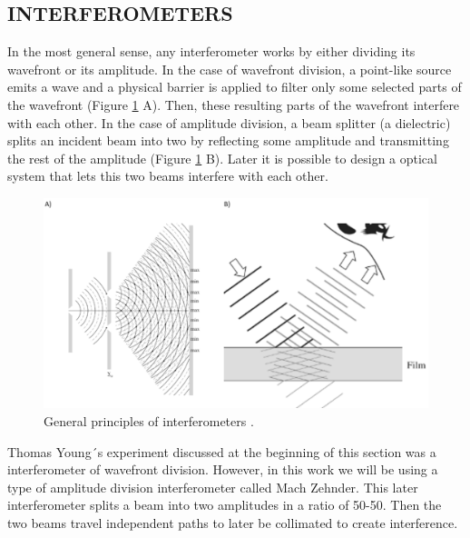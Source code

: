 \subsection{INTERFEROMETERS}
In the most general sense, any interferometer works by either dividing its wavefront or its amplitude. In the case of wavefront division, a point-like source emits a wave and a physical barrier is applied to filter only some selected parts of the wavefront (Figure \ref{fig:Interf_Types} A). Then, these resulting parts of the wavefront interfere with each other. In the case of amplitude division, a beam splitter (a dielectric) splits an incident beam into two by reflecting some amplitude and transmitting the rest of the amplitude (Figure \ref{fig:Interf_Types} B). Later it is possible to design a optical system that lets this two beams interfere with each other. 

\begin{figure} [H]
    \centering
    \includegraphics[width=.30\textwidth]{Figures/Figures_I/Interferometers_Types.png}
    \caption{General principles of interferometers \cite{hecht1987optics}.}
    \label{fig:Interf_Types}
\end{figure}

Thomas Young´s experiment discussed at the beginning of this section was a interferometer of wavefront division. However, in this work we will be using a type of amplitude division interferometer called Mach Zehnder. This later interferometer splits a beam into two amplitudes in a ratio of 50-50. Then the two beams travel independent paths to later be collimated to create interference.

